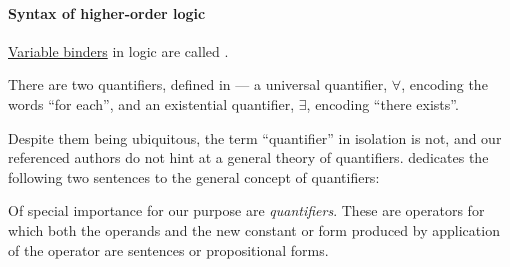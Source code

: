 \paragraph{Syntax of higher-order logic}

\begin{concept}\label{con:quantifier}
  \hyperref[con:variable_binding]{Variable binders} in logic are called .
\end{concept}
\begin{comments}
  \item There are two quantifiers, defined in  --- a universal quantifier, \( \forall \), encoding the words \enquote{for each}, and an existential quantifier, \( \exists \), encoding \enquote{there exists}.

  Despite them being ubiquitous, the term \enquote{quantifier} in isolation is not, and our referenced authors do not hint at a general theory of quantifiers.  dedicates the following two sentences to the general concept of quantifiers:
  \begin{displayquote}
    Of special importance for our purpose are \textit{quantifiers}. These are operators for which both the operands and the new constant or form produced by application of the operator are sentences or propositional forms.
  \end{displayquote}
\end{comments}

